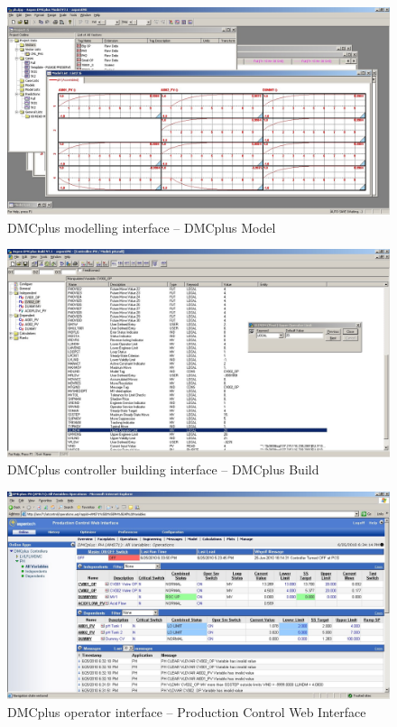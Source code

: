 \begin{landscape}
  \begin{figure}[htbp]
    \centering
      \includegraphics[width=25cm]{graph/ss_dmcplusdmcmodel.jpg}
    \caption[DMCplus Model interface]{DMCplus modelling interface -- DMCplus Model}
    \label{fig:ssdmcplusmodel}
  \end{figure}

  \begin{figure}[htbp]
    \centering
      \includegraphics[width=25cm]{graph/ss_dmcplusdmcbuild.jpg}
    \caption[DMCplus Build interface]{DMCplus controller building interface -- DMCplus Build}
    \label{fig:ssdmcpluscontrolbuild}
  \end{figure}

  \begin{figure}[htbp]
    \centering
      \includegraphics[width=25cm]{graph/ss_dmcpluswebinterface.jpg}
    \caption[DMCplus Production Control Web Interface]{DMCplus operator interface -- Production Control Web Interface}
    \label{fig:ssdmcplusoperator}
  \end{figure}

\end{landscape}

